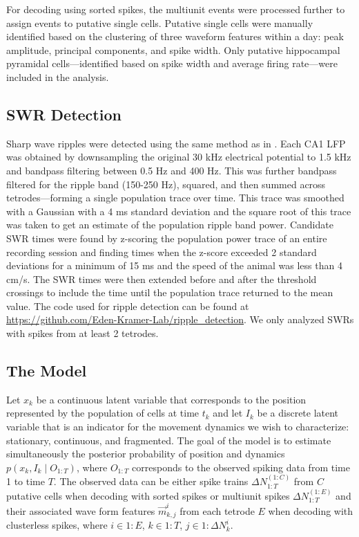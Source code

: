 \documentclass[9pt,lineno]{elife}
\begin{document}
For decoding using sorted spikes, the multiunit events were processed further to assign events to putative single cells. Putative single cells were manually identified based on the clustering of three waveform features within a day: peak amplitude, principal components, and spike width. Only putative hippocampal pyramidal cells---identified based on spike width and average firing rate---were included in the analysis.

\subsection*{SWR Detection}
Sharp wave ripples were detected using the same method as in \cite{Kayhippocampalnetworkspatial2016}. Each CA1 LFP was obtained by downsampling the original 30 kHz electrical potential to 1.5 kHz and bandpass filtering between 0.5 Hz and 400 Hz. This was further bandpass filtered for the ripple band (150-250 Hz), squared, and then summed across tetrodes---forming a single population trace over time. This trace was smoothed with a Gaussian with a 4 ms standard deviation and the square root of this trace was taken to get an estimate of the population ripple band power. Candidate SWR times were found by z-scoring the population power trace of an entire recording session and finding times when the z-score exceeded 2 standard deviations for a minimum of 15 ms and the speed of the animal was less than 4 cm/s. The SWR times were then extended before and after the threshold crossings to include the time until the population trace returned to the mean value. The code used for ripple detection can be found at \url{https://github.com/Eden-Kramer-Lab/ripple_detection}. We only analyzed SWRs with spikes from at least 2 tetrodes.

\subsection*{The Model}
Let $x_{k}$ be a continuous latent variable that corresponds to the position represented by the population of cells at time $t_k$ and let $I_{k}$ be a discrete latent variable that is an indicator for the movement dynamics we wish to characterize: stationary, continuous, and fragmented. The goal of the model is to estimate simultaneously the posterior probability of position and dynamics $p(x_k, I_k \mid O_{1:T})$, where $O_{1:T}$ corresponds to the observed spiking data from time 1 to time $T$. The observed data can be either spike trains $\Delta N_{1:T}^{(1:C)}$ from $C$ putative cells when decoding with sorted spikes or multiunit spikes $\Delta N_{1:T}^{(1:E)}$ and their associated wave form features $\Vec{m}^i_{k,j}$ from each tetrode $E$ when decoding with clusterless spikes, where $i \in 1:E$, $k \in 1:T$, $j \in 1:\Delta N_k^i$.
\end{document}
